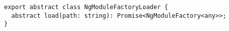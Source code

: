 \begin{verbatim}
export abstract class NgModuleFactoryLoader {
  abstract load(path: string): Promise<NgModuleFactory<any>>;
}
\end{verbatim}
